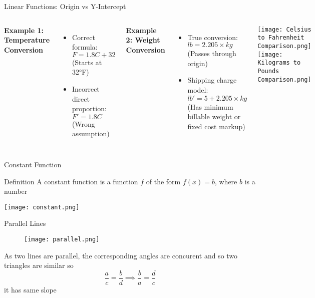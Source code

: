   \begin{frame}{Linear Functions: Origin vs Y-Intercept}

    \begin{columns}
        \textbf{Example 1: Temperature Conversion}
        \begin{itemize}
            \item Correct formula: \( F = 1.8C + 32 \) (Starts at 32°F)
            \item Incorrect direct proportion: \( F' = 1.8C \) (Wrong assumption)
        \end{itemize}
    
        \textbf{Example 2: Weight Conversion}
        \begin{itemize}
            \item True conversion: \( lb = 2.205 \times kg \) (Passes through origin)
            \item Shipping charge model: \( lb' = 5 + 2.205 \times kg \) (Has minimum billable weight or fixed cost markup)
        \end{itemize}
    
        \centering
        \texttt{[image: Celsius to Fahrenheit Comparison.png]} \\ %
        \texttt{[image: Kilograms to Pounds Comparison.png]} %
    \end{columns}
    \end{frame}
\begin{frame}{Constant Function}
    \begin{block}{Definition}
      A constant function is a function \(f\) of the form \(f (x) = b\),  where \(b\) is a number 
    \end{block}
    \centering
    \texttt{[image: constant.png]} 
  \end{frame}

  \begin{frame}{Parallel Lines}
    \begin{figure}
      \centering
      \texttt{[image: parallel.png]}
    \end{figure}
    As two lines are parallel, the corresponding angles are concurent and so two triangles are similar so 
\[\frac{a}{c} = \frac{b}{d} \implies \frac{b}{a} = \frac{d}{c}  \] 
it has same slope
  \end{frame}

